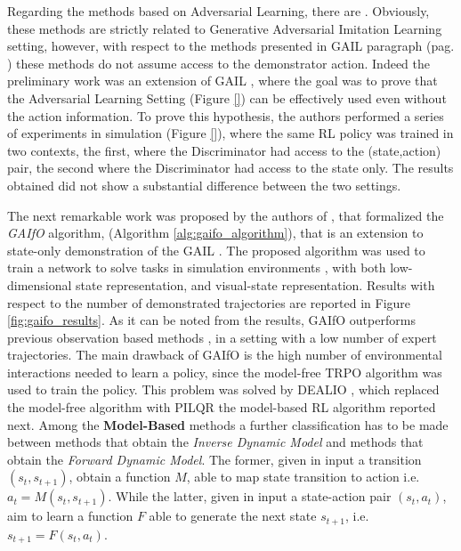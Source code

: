\newline Regarding the methods based on Adversarial Learning, there are \cite{merel2017learning,torabi2018gaifo}. Obviously, these methods are strictly related to Generative Adversarial Imitation Learning setting, however, with respect to the methods presented in GAIL paragraph (pag. \pageref{para:gail}) these methods do not assume access to the demonstrator action. Indeed the preliminary work \cite{merel2017learning} was an extension of GAIL \cite{ho2016gail}, where the goal was to prove that the Adversarial Learning Setting (Figure \ref{}) can be effectively used even without the action information. To prove this hypothesis, the authors performed a series of experiments in simulation (Figure \ref{}), where the same RL policy was trained in two contexts, the first, where the Discriminator had access to the (state,action) pair, the second where the Discriminator had access to the state only. The results obtained did not show a substantial difference between the two settings. 

\newline The next remarkable work was proposed by the authors of \cite{torabi2018gaifo}, that formalized the \textit{GAIfO} algorithm, (Algorithm \ref{alg:gaifo_algorithm}), that is an extension to state-only demonstration of the GAIL \cite{ho2016gail}. The proposed algorithm was used to train a network to solve tasks in simulation environments \cite{brockman2016openai}, with both low-dimensional state representation, and visual-state representation. Results with respect to the number of demonstrated trajectories are reported in Figure \ref{fig:gaifo_results}.
As it can be noted from the results, GAIfO outperforms previous observation based methods \cite{sermanet2018time_contrastive,torabi2018bco}, in a setting with a low number of expert trajectories. The main drawback of GAIfO is the high number of environmental interactions needed to learn a policy, since the model-free TRPO \cite{schulman2015trpo} algorithm was used to train the policy. This problem was solved by DEALIO \cite{torabi2021dealio}, which replaced the model-free algorithm with PILQR \cite{chebotar2017pilqr} the model-based RL algorithm reported next. 
\noindent Among the \textbf{Model-Based} methods a further classification has to be made between methods that obtain the \textit{Inverse Dynamic Model} and methods that obtain the \textit{Forward Dynamic Model}. The former, given in input a transition $(s_{t}, s_{t+1})$, obtain a function $M$, able to map state transition to action i.e. $a_{t} = M(s_{t}, s_{t+1})$. While the latter, given in input a state-action pair $(s_{t}, a_{t})$, aim to learn a function $F$ able to generate the next state $s_{t+1}$, i.e. $s_{t+1} = F(s_{t}, a_{t})$.
